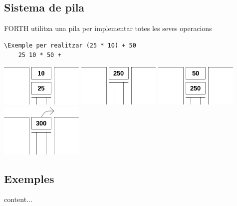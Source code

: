\documentclass{beamer}
\begin{document}
\subsection{Sistema de pila}

\begin{frame}[fragile]
    FORTH utilitza una pila per implementar totes les seves operacions
    
    \begin{lstlisting}[frame=single]
    \Exemple per realitzar (25 * 10) + 50
    25 10 * 50 +
    \end{lstlisting}
    
    \centering
    \includegraphics[width=0.2\linewidth]{stack_1}
    \hfill
    \includegraphics[width=0.2\linewidth]{stack_2}
    \hfill
    \includegraphics[width=0.2\linewidth]{stack_3}
    \hfill
    \includegraphics[width=0.2\linewidth]{stack_4}
\end{frame}

\subsection{Exemples}

\begin{frame}[fragile]
    content...
\end{frame}
\end{document}
